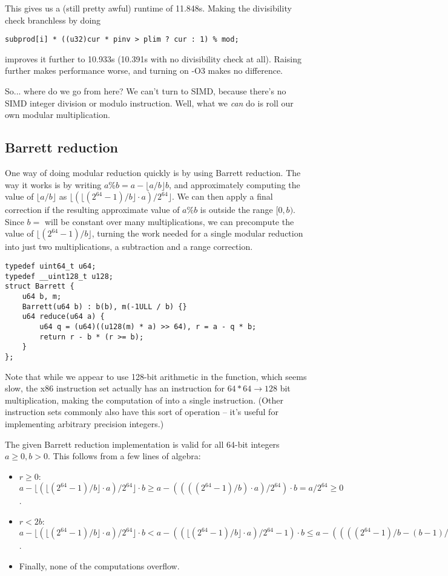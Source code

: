 \documentclass[openany]{book}
\begin{document}
This gives us a (still pretty awful) runtime of 11.848s.
Making the divisibility check branchless by doing
\begin{lstlisting}
subprod[i] * ((u32)cur * pinv > plim ? cur : 1) % mod;
\end{lstlisting}
improves it further to 10.933s (10.391s with no divisibility check at all).
Raising \verb@PAR@ further makes performance worse, and turning on -O3 makes no difference.

So... where do we go from here?
We can't turn to SIMD, because there's no SIMD integer division or modulo instruction.
Well, what we \emph{can} do is roll our own modular multiplication.

\subsection*{Barrett reduction}
One way of doing modular reduction quickly is by using Barrett reduction.
The way it works is by writing $a \% b = a - \lfloor a / b \rfloor b$, and approximately computing the value of $\lfloor a / b \rfloor$ as $\lfloor (\lfloor (2^{64} - 1) / b \rfloor \cdot a) / 2^{64} \rfloor$.
We can then apply a final correction if the resulting approximate value of $a \% b$ is outside the range $[0, b)$.
Since $b =$ \verb@mod@ will be constant over many multiplications, we can precompute the value of $\lfloor (2^{64} - 1) / b \rfloor$, turning the work needed for a single modular reduction into just two multiplications, a subtraction and a range correction.
\begin{lstlisting}
typedef uint64_t u64;
typedef __uint128_t u128;
struct Barrett {
	u64 b, m;
	Barrett(u64 b) : b(b), m(-1ULL / b) {}
	u64 reduce(u64 a) {
		u64 q = (u64)((u128(m) * a) >> 64), r = a - q * b;
		return r - b * (r >= b);
	}
};
\end{lstlisting}

Note that while we appear to use 128-bit arithmetic in the \verb@reduce@ function, which seems slow, the x86 instruction set actually has an instruction for \mbox{$64*64\rightarrow128$} bit multiplication, making the computation of \verb@q@ into a single instruction.
(Other instruction sets commonly also have this sort of operation -- it's useful for implementing arbitrary precision integers.)

The given Barrett reduction implementation is valid for all 64-bit integers $a \ge 0, b > 0$. This follows from a few lines of algebra:
\begin{itemize}
\item $r \ge 0$: $a - \lfloor(\lfloor (2^{64} - 1) / b\rfloor \cdot a)/2^{64}\rfloor \cdot b \ge a - ((((2^{64} - 1) / b) \cdot a)/2^{64}) \cdot b = a / 2^{64} \ge 0$.
\item $r < 2b$: $a - \lfloor(\lfloor (2^{64} - 1) / b\rfloor \cdot a)/2^{64}\rfloor \cdot b < a - ((\lfloor (2^{64} - 1) / b\rfloor \cdot a)/2^{64} - 1) \cdot b \le a - ((((2^{64} - 1) / b - (b - 1) / b) \cdot a)/2^{64} - 1) \cdot b = b (1 + a/2^{64}) < 2b$.
\item Finally, none of the computations overflow.
\end{itemize}
\end{document}

